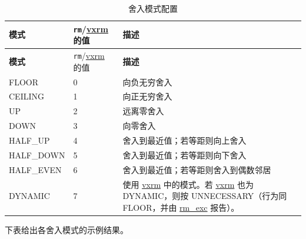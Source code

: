 \documentclass[main\_\_CN.tex]{subfiles}
\begin{document}
\begin{longtable}[c]{|l|l|m{10cm}|}
    \caption{舍入模式配置}
    \label{tab:ESP-rounding-mode-config}\\
    \hline
    \rowcolor{lightgray}
    \textbf{模式} & \texttt{rm}/\hyperref[vxrm]{vxrm} 的值 & \textbf{描述} \\\hline
    \endfirsthead
    \rowcolor{lightgray}
    \textbf{模式} & \texttt{rm}/\hyperref[vxrm]{vxrm} 的值 & \textbf{描述} \\\hline
    \endhead
    \endfoot

FLOOR & 0 & 向负无穷舍入 \\\hline

CEILING & 1 & 向正无穷舍入 \\\hline

UP & 2 & 远离零舍入 \\\hline

DOWN & 3 & 向零舍入 \\\hline

HALF\_UP & 4 & 舍入到最近值；若等距则向上舍入 \\\hline

HALF\_DOWN & 5 & 舍入到最近值；若等距则向下舍入 \\\hline

HALF\_EVEN & 6 & 舍入到最近值；若等距则舍入到偶数邻居 \\\hline

DYNAMIC & 7 & 使用 \hyperref[vxrm]{vxrm} 中的模式。若 \hyperref[vxrm]{vxrm} 也为 DYNAMIC，则按 UNNECESSARY（行为同 FLOOR，并由 \hyperref[rm_exc]{rm\_exc} 报告）。 \\\hline

    \end{longtable}

下表给出各舍入模式的示例结果。
\end{document}
